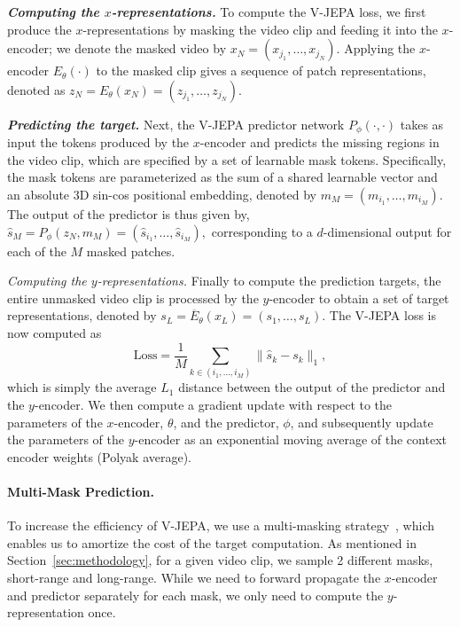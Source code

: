 \documentclass[twocolumn]{fairmeta}
\newcommand{\putalg}{{\small V-JEPA}\xspace}
\theoremstyle{plain}
\theoremstyle{definition}
\theoremstyle{remark}
\begin{document}
{\bf \it Computing the  $x$-representations.}
To compute the \putalg loss, we first produce the $x$-representations by masking the video clip and feeding it into the $x$-encoder; we denote the masked video by $x_N = (x_{j_1}, \ldots, x_{j_N})$.
Applying the $x$-encoder $E_\theta(\cdot)$ to the masked clip gives a sequence of patch representations, denoted as
$z_N = E_{\theta}(x_N) = (z_{j_1}, \ldots, z_{j_N}).$

{\bf \it Predicting the target.}
Next, the \putalg predictor network $P_\phi(\cdot, \cdot)$ takes as input the tokens produced by the $x$-encoder and predicts the missing regions in the video clip, which are specified by a set of learnable mask tokens.
Specifically, the mask tokens are parameterized as the sum of a shared learnable vector and an absolute 3D sin-cos positional embedding, denoted by $m_M = (m_{i_1}, \ldots, m_{i_M})$.
The output of the predictor is thus given by,
$\hat s_M = P_\phi(z_N, m_M) = (\hat s_{i_1}, \ldots, \hat s_{i_M}),$
corresponding to a $d$-dimensional output for each of the $M$ masked patches.

{\it Computing the $y$-representations.}
Finally to compute the prediction targets, the entire unmasked video clip is processed by the $y$-encoder to obtain a set of target representations, denoted by
$s_L = \overline{E}_{\theta}(x_L) = (s_1, \ldots, s_L).$
The \putalg loss is now computed as
\begin{equation}    
    \label{eq:loss_detail}
    \text{Loss} = \frac{1}{M} \sum_{k \in (i_1, \ldots, i_M)} \lVert \hat s_{k} - s_k \rVert_1,
\end{equation}
which is simply the average $L_1$ distance between the output of the predictor and the $y$-encoder.
We then compute a gradient update with respect to the parameters of the $x$-encoder, $\theta$, and the predictor, $\phi$, and subsequently update the parameters of the $y$-encoder as an exponential moving average of the context encoder weights (Polyak average).

\paragraph{\bf Multi-Mask Prediction.}
To increase the efficiency of \putalg, we use a multi-masking strategy~\citep{caron2020unsupervised,baevski2022efficient}, which enables us to amortize the cost of the target computation.
As mentioned in Section~\ref{sec:methodology}, for a given video clip, we sample 2 different masks, short-range and long-range.
While we need to forward propagate the $x$-encoder and predictor separately for each mask, we only need to compute the $y$-representation once.
\end{document}

